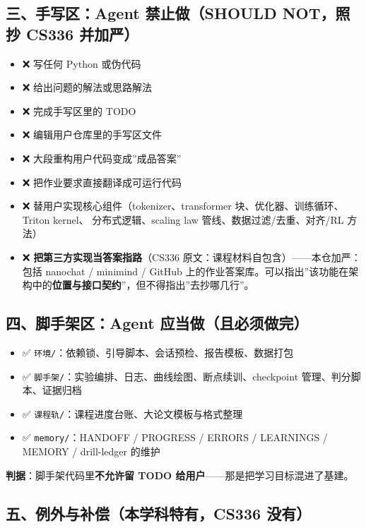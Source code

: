 \documentclass[
  chinese,
  11pt,
]{ctexart}
\providecommand{\tightlist}{%
  \setlength{\itemsep}{0pt}\setlength{\parskip}{0pt}}
\begin{document}
\subsection{三、手写区：Agent 禁止做（SHOULD NOT，照抄 CS336 并加严）}\label{ux4e09ux624bux5199ux533aagent-ux7981ux6b62ux505ashould-notux7167ux6284-cs336-ux5e76ux52a0ux4e25}

\begin{itemize}
\tightlist
\item
  ❌ 写任何 Python 或伪代码
\item
  ❌ 给出问题的解法或思路解法
\item
  ❌ 完成手写区里的 TODO
\item
  ❌ 编辑用户仓库里的手写区文件
\item
  ❌ 大段重构用户代码变成''成品答案''
\item
  ❌ 把作业要求直接翻译成可运行代码
\item
  ❌ 替用户实现核心组件（tokenizer、transformer 块、优化器、训练循环、Triton kernel、 分布式逻辑、scaling law 管线、数据过滤/去重、对齐/RL 方法）
\item
  ❌ \textbf{把第三方实现当答案指路}（CS336 原文：课程材料自包含）------本仓加严：包括 nanochat / minimind / GitHub 上的作业答案库。可以指出''该功能在架构中的\textbf{位置与接口契约}''，但不得指出''去抄哪几行''。
\end{itemize}

\subsection{四、脚手架区：Agent 应当做（且必须做完）}\label{ux56dbux811aux624bux67b6ux533aagent-ux5e94ux5f53ux505aux4e14ux5fc5ux987bux505aux5b8c}

\begin{itemize}
\tightlist
\item
  ✅ \texttt{环境/}：依赖锁、引导脚本、会话预检、报告模板、数据打包
\item
  ✅ \texttt{脚手架/}：实验编排、日志、曲线绘图、断点续训、checkpoint 管理、判分脚本、证据归档
\item
  ✅ \texttt{课程轨/}：课程进度台账、大论文模板与格式整理
\item
  ✅ \texttt{memory/}：HANDOFF / PROGRESS / ERRORS / LEARNINGS / MEMORY / drill-ledger 的维护
\end{itemize}

\textbf{判据}：脚手架代码里\textbf{不允许留 TODO 给用户}------那是把学习目标混进了基建。

\subsection{五、例外与补偿（本学科特有，CS336 没有）}\label{ux4e94ux4f8bux5916ux4e0eux8865ux507fux672cux5b66ux79d1ux7279ux6709cs336-ux6ca1ux6709}
\end{document}
